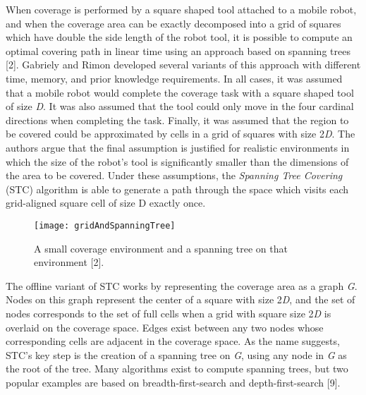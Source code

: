 When coverage is performed by a square shaped tool attached to a mobile robot, and when the coverage area can be exactly decomposed into a grid of squares which have double the side length of the robot tool, it is possible to compute an optimal covering path in linear time using an approach based on spanning trees [2]. Gabriely and Rimon developed several variants of this approach with different time, memory, and prior knowledge requirements. In all cases, it was assumed that a mobile robot would complete the coverage task with a square shaped tool of size \textit{D}. It was also assumed that the tool could only move in the four cardinal directions when completing the task. Finally, it was assumed that the region to be covered could be approximated by cells in a grid of squares with size 2\textit{D}. The authors argue that the final assumption is justified for realistic environments in which the size of the robot's tool is significantly smaller than the dimensions of the area to be covered. Under these assumptions, the \textit{Spanning Tree Covering} (STC) algorithm is able to generate a path through the space which visits each grid-aligned square cell of size D exactly once.

\begin{figure}[H]
\texttt{[image: gridAndSpanningTree]}
\caption[Spanning Tree Example]{A small coverage environment and a spanning tree on that environment [2].}
\end{figure}

The offline variant of STC works by representing the coverage area as a graph \textit{G}. Nodes on this graph represent the center of a square with size 2\textit{D}, and the set of nodes corresponds to the set of full cells when a grid with square size 2\textit{D} is overlaid on the coverage space. Edges exist between any two nodes whose corresponding cells are adjacent in the coverage space. As the name suggests, STC's key step is the creation of a spanning tree on \textit{G}, using any node in \textit{G} as the root of the tree. Many algorithms exist to compute spanning trees, but two popular examples are based on breadth-first-search and depth-first-search [9].

